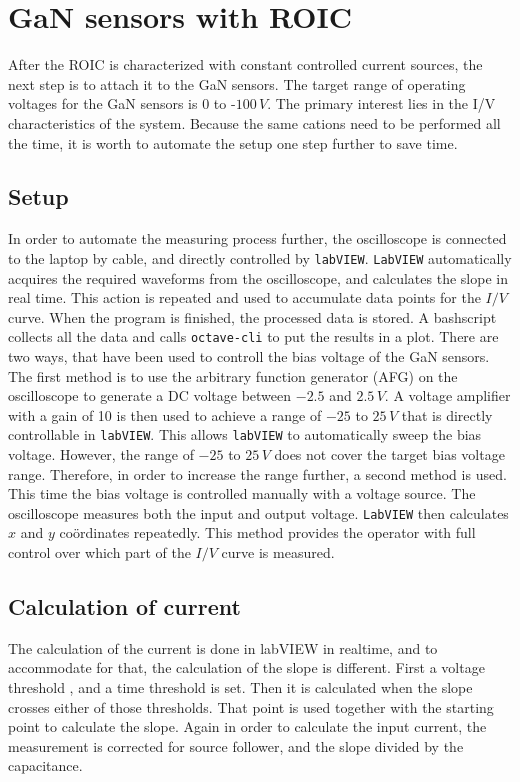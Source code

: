 \section{GaN sensors with ROIC}\label{sec:GaN_sensors_with_ROIC}
After the ROIC is characterized with constant controlled current sources, the next step is to attach it to the GaN sensors. The target range of operating voltages for the GaN sensors is 0 to -$100\,V$. The primary interest lies in the I/V characteristics of the system. Because the same cations need to be performed all the time, it is worth to automate the setup one step further to save time.

\subsection{Setup}\label{ssec:GaN_setup}
In order to automate the measuring process further, the oscilloscope is connected to the laptop by cable, and directly controlled by \texttt{labVIEW}. \texttt{LabVIEW} automatically acquires the required waveforms from the oscilloscope, and calculates the slope in real time. This action is repeated and used to accumulate data points for the $I/V$ curve. When the  program is finished, the processed data is stored. A bashscript collects all the data and calls \texttt{octave-cli} to put the results in a plot. There are two ways, that have been used to controll the bias voltage of the GaN sensors. The first method is to use the arbitrary function generator (AFG) on the oscilloscope to generate a DC voltage between $-2.5$ and $2.5\,V$. A voltage amplifier with a gain of 10 is then used to achieve a range of $-25$ to $25\,V$ that is directly controllable in \texttt{labVIEW}. This allows \texttt{labVIEW} to automatically sweep the bias voltage. However, the range of $-25$ to $25\,V$ does not cover the target bias voltage range. Therefore, in order to increase the range further, a second method is used. This time the bias voltage is controlled manually with a voltage source. The oscilloscope measures both the input and output voltage. \texttt{LabVIEW} then calculates $x$ and $y$ co\"ordinates repeatedly. This method provides the operator with full control over which part of the $I/V$ curve is measured.

\subsection{Calculation of current}
The calculation of the current is done in labVIEW in realtime, and to accommodate for that, the calculation of the slope is different. First a voltage threshold , and a time threshold is set. Then it is calculated when the slope crosses either of those thresholds. That point is used together with the starting point to calculate the slope. Again in order to calculate the input current, the measurement is corrected for source follower, and the slope divided by the capacitance. 


